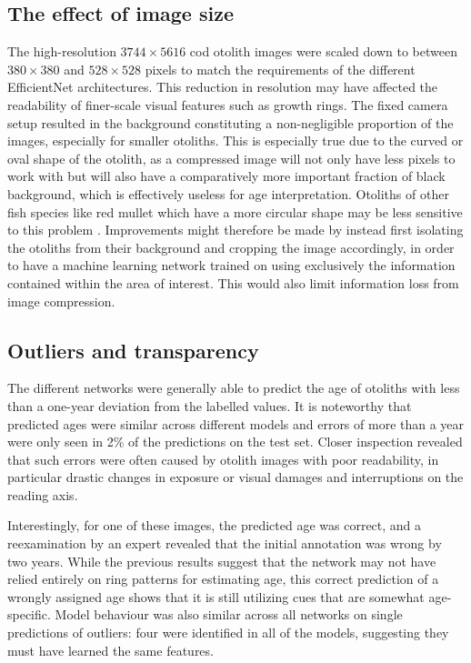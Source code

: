 \documentclass[10pt,letterpaper]{article}
\begin{document}
\subsection{The effect of image size}
The high-resolution $3744×5616$ cod otolith images were scaled down to between $380×380$ and $528×528$ pixels to match the requirements of the different EfficientNet architectures. This reduction in resolution may have affected the readability of finer-scale visual features such as growth rings. The fixed camera setup resulted in the background constituting a non-negligible proportion of the images, especially for smaller otoliths. 
This is especially true due to the curved or oval shape of the otolith, as a compressed image will not only have less pixels to work with but will also have a comparatively more important fraction of black background, which is effectively useless for age interpretation. Otoliths of other fish species like red mullet which have a more circular shape may be less sensitive to this problem \citep{Politikos}.
 Improvements might therefore be made by instead first isolating the otoliths from their background and cropping the image accordingly, in order to have a machine learning network trained on using exclusively the information contained within the area of interest. This would also limit information loss from image compression.


\subsection{Outliers and transparency}
The different networks were generally able to predict the age of otoliths with less than a one-year deviation from the labelled values. It is noteworthy that predicted ages were similar across different models and errors of more than a year were only seen in 2\% of the predictions on the test set. Closer inspection revealed that such errors were often caused by otolith images with poor readability, in particular drastic changes in exposure or visual damages and interruptions on the reading axis. 

Interestingly, for one of these images, the predicted age was correct, and a reexamination by an expert revealed that the initial annotation was wrong by two years. While the previous results suggest that the network may not have relied entirely on ring patterns for estimating age, this correct prediction of a wrongly assigned age shows that it is still utilizing cues that are somewhat age-specific. Model behaviour was also similar across all networks on single predictions of outliers: four  were identified in all of the models, suggesting they must have learned the same features.
\end{document}
